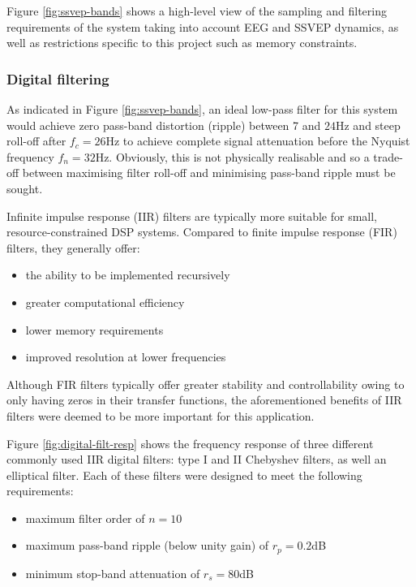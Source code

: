 Figure \ref{fig:ssvep-bands} shows a high-level view of the sampling and filtering requirements of the system taking into account EEG and SSVEP dynamics, as well as restrictions specific to this project such as memory constraints. 

\subsubsection{Digital filtering}
\label{subsection:digital-filtering}
As indicated in Figure \ref{fig:ssvep-bands}, an ideal low-pass filter for this system would achieve zero pass-band distortion (ripple) between 7 and $24$Hz and steep roll-off after $f_c=26$Hz to achieve complete signal attenuation before the Nyquist frequency $f_n=32$Hz. Obviously, this is not physically realisable and so a trade-off between maximising filter roll-off and minimising pass-band ripple must be sought.  

Infinite impulse response (IIR) filters are typically more suitable for small, resource-constrained DSP systems. Compared to finite impulse response (FIR) filters, they generally offer:
\begin{itemize}
    \item the ability to be implemented recursively
    \item greater computational efficiency
    \item lower memory requirements
    \item improved resolution at lower frequencies
\end{itemize}
Although FIR filters typically offer greater stability and controllability owing to only having zeros in their transfer functions, the aforementioned benefits of IIR filters were deemed to be more important for this application. 

Figure \ref{fig:digital-filt-resp} shows the frequency response of three different commonly used IIR digital filters: type I and II Chebyshev filters, as well an elliptical filter. Each of these filters were designed to meet the following requirements:
\begin{itemize}
\label{list:filter-design-reqs}
    \item maximum filter order of $n=10$
    \item maximum pass-band ripple (below unity gain) of $r_p=0.2$dB 
    \item minimum stop-band attenuation of $r_s=80$dB
\end{itemize}

